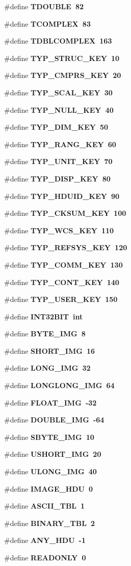 \begin{CompactItemize}
\item 
\#define \bf{TDOUBLE}~82
\item 
\#define \bf{TCOMPLEX}~83
\item 
\#define \bf{TDBLCOMPLEX}~163
\item 
\#define \bf{TYP\_\-STRUC\_\-KEY}~10
\item 
\#define \bf{TYP\_\-CMPRS\_\-KEY}~20
\item 
\#define \bf{TYP\_\-SCAL\_\-KEY}~30
\item 
\#define \bf{TYP\_\-NULL\_\-KEY}~40
\item 
\#define \bf{TYP\_\-DIM\_\-KEY}~50
\item 
\#define \bf{TYP\_\-RANG\_\-KEY}~60
\item 
\#define \bf{TYP\_\-UNIT\_\-KEY}~70
\item 
\#define \bf{TYP\_\-DISP\_\-KEY}~80
\item 
\#define \bf{TYP\_\-HDUID\_\-KEY}~90
\item 
\#define \bf{TYP\_\-CKSUM\_\-KEY}~100
\item 
\#define \bf{TYP\_\-WCS\_\-KEY}~110
\item 
\#define \bf{TYP\_\-REFSYS\_\-KEY}~120
\item 
\#define \bf{TYP\_\-COMM\_\-KEY}~130
\item 
\#define \bf{TYP\_\-CONT\_\-KEY}~140
\item 
\#define \bf{TYP\_\-USER\_\-KEY}~150
\item 
\#define \bf{INT32BIT}~int
\item 
\#define \bf{BYTE\_\-IMG}~8
\item 
\#define \bf{SHORT\_\-IMG}~16
\item 
\#define \bf{LONG\_\-IMG}~32
\item 
\#define \bf{LONGLONG\_\-IMG}~64
\item 
\#define \bf{FLOAT\_\-IMG}~-32
\item 
\#define \bf{DOUBLE\_\-IMG}~-64
\item 
\#define \bf{SBYTE\_\-IMG}~10
\item 
\#define \bf{USHORT\_\-IMG}~20
\item 
\#define \bf{ULONG\_\-IMG}~40
\item 
\#define \bf{IMAGE\_\-HDU}~0
\item 
\#define \bf{ASCII\_\-TBL}~1
\item 
\#define \bf{BINARY\_\-TBL}~2
\item 
\#define \bf{ANY\_\-HDU}~-1
\item 
\#define \bf{READONLY}~0

\end{CompactItemize}
